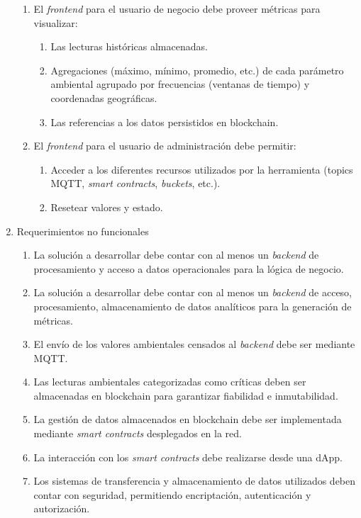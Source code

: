 \begin{enumerate}
\begin{enumerate}
		\item El \textit{frontend} para el usuario de negocio debe proveer métricas para visualizar:
			\begin{enumerate}				
				\item Las lecturas históricas almacenadas.				
				\item Agregaciones (máximo, mínimo, promedio, etc.) de cada parámetro ambiental agrupado por frecuencias (ventanas de tiempo) y coordenadas geográficas.				
				\item Las referencias a los datos persistidos en blockchain.
			\end{enumerate}			
		\item El \textit{frontend} para el usuario de administración debe permitir:
			\begin{enumerate}				
				\item Acceder a los diferentes recursos utilizados por la herramienta (topics MQTT, \textit{smart contracts}, \textit{buckets}, etc.).
				\item Resetear valores y estado.			
			\end{enumerate}			
		\end{enumerate}	

					
	\item Requerimientos no funcionales		
	\begin{enumerate}	
		\item La solución a desarrollar debe contar con al menos un \textit{backend} de procesamiento y acceso a datos operacionales para la lógica de negocio.
		\item La solución a desarrollar debe contar con al menos un \textit{backend} de acceso, procesamiento, almacenamiento de datos analíticos para la generación de métricas.		
		\item El envío de los valores ambientales censados al \textit{backend} debe ser mediante MQTT.
		\item Las lecturas ambientales categorizadas como críticas deben ser almacenadas en blockchain para garantizar fiabilidad e inmutabilidad.
		\item La gestión de datos almacenados en blockchain debe ser implementada mediante \textit{smart contracts} desplegados en la red.
		\item La interacción con los \textit{smart contracts} debe realizarse desde una dApp.
		\item Los sistemas de transferencia y almacenamiento de datos utilizados deben contar con seguridad, permitiendo encriptación, autenticación y autorización.	
		\end{enumerate}	
		

\end{enumerate}
